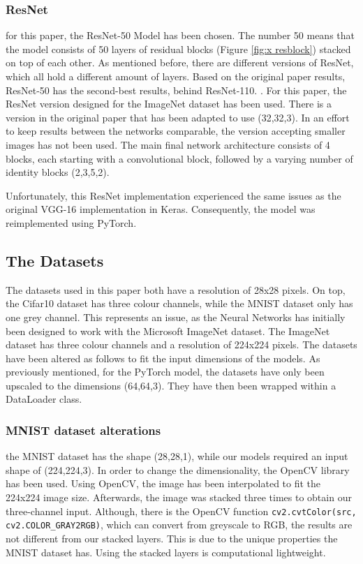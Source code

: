 \documentclass[conference]{IEEEtran}
\begin{document}
\subsubsection{ResNet}
for this paper, the ResNet-50 Model has been chosen. 
The number 50 means that the model consists of 50 layers of residual blocks (Figure \ref{fig:x resblock}) stacked on top of each other. 
As mentioned before, there are different versions of ResNet, which all hold a different amount of layers. 
Based on the original paper results, ResNet-50 has the second-best results, behind ResNet-110. \cite{he_deep_2015}.  
For this paper, the ResNet version designed for the ImageNet dataset has been used. There is a version in the original paper that has been adapted to use (32,32,3). 
In an effort to keep results between the networks comparable, the version accepting smaller images has not been used.
The main final network architecture consists of 4 blocks, each starting with a convolutional block, followed by a varying number of identity blocks (2,3,5,2).

Unfortunately, this ResNet implementation experienced the same issues as the original VGG-16 implementation in Keras. Consequently, the model was reimplemented using PyTorch.

\subsection{The Datasets}\label{ID}

The datasets used in this paper both have a resolution of 28x28 pixels. 
On top, the Cifar10 dataset has three colour channels, while the MNIST dataset only has one grey channel.
This represents an issue, as the Neural Networks has initially been designed to work with the Microsoft ImageNet dataset. 
The ImageNet dataset has three colour channels and a resolution of 224x224 pixels.
The datasets have been altered as follows to fit the input dimensions of the models.
As previously mentioned, for the PyTorch model, the datasets have only been upscaled to the dimensions (64,64,3).
They have then been wrapped within a DataLoader class.

\subsubsection{MNIST dataset alterations}
the MNIST dataset has the shape (28,28,1), while our models required an input shape of (224,224,3). 
In order to change the dimensionality, the OpenCV library has been used. Using OpenCV, the image has been interpolated to fit the 224x224 image size. 
Afterwards, the image was stacked three times to obtain our three-channel input. Although, there is the OpenCV function \verb|cv2.cvtColor(src, cv2.COLOR_GRAY2RGB)|, 
which can convert from greyscale to RGB, the results are not different from our stacked layers. 
This is due to the unique properties the MNIST dataset has. Using the stacked layers is computational lightweight.
\end{document}
